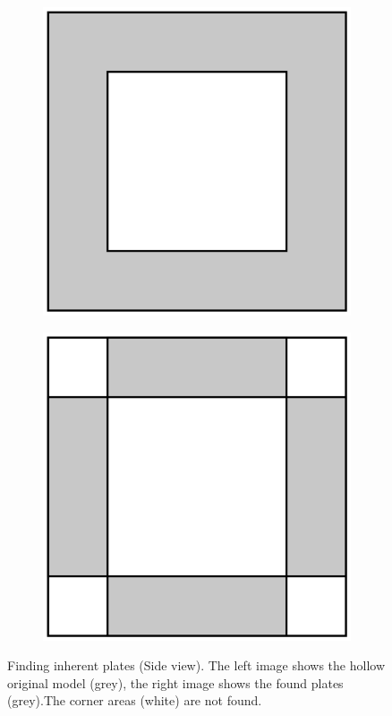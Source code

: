 \documentclass[../ClassicThesis.tex]{subfiles}
\begin{document}
\begin{figure}
    \centering
    \begin{subfigure}[t]{0.4\textwidth}
      \centering
      \includegraphics[width=\textwidth]{Images/plates_inherentplates_1.png}
    \end{subfigure}
    \begin{subfigure}[t]{0.4\textwidth}
      \centering
      \includegraphics[width=\textwidth]{Images/plates_inherentplates_2.png}
    \end{subfigure}
    \caption{Finding inherent plates (Side view). The left image shows the hollow original model (grey), the right image shows the found plates (grey).The corner areas (white) are not found.}
    \label{fig:inhplates}
\end{figure}
\end{document}

